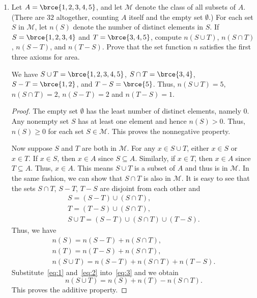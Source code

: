 \documentclass[a4paper]{article}
\begin{document}
\begin{enumerate}
\item Let \(A = \brce{1, 2, 3, 4, 5}\), and let \(\mathcal{M}\) denote the
  class of all subsets of \(A\).  (There are \(32\) altogether, counting
  \(A\) itself and the empty set \(\emptyset\).)  For each set \(S\) in
  \(\mathcal{M}\), let \(n(S)\) denote the number of distinct elements in
  \(S\).  If \(S = \brce{1, 2, 3, 4}\) and \(T = \brce{3, 4, 5}\), compute
  \(n(S \cup T)\), \(n(S \cap T)\), \(n(S - T)\), and \(n(T - S)\).  Prove
  that the set function \(n\) satisfies the first three axioms for area.

  We have \(S \cup T = \brce{1, 2, 3, 4, 5}\), \(S \cap T = \brce{3, 4}\),
  \(S - T = \brce{1, 2}\), and \(T - S = \brce{5}\).  Thus,
  \(n(S \cup T) = 5\), \(n(S \cap T) = 2\), \(n(S - T) = 2\) and
  \(n(T - S) = 1\).

  \begin{proof}
    The empty set \(\emptyset\) has the least number of distinct elements,
    namely \(0\).  Any nonempty set \(S\) has at least one element and hence
    \(n(S) > 0\).  Thus, \(n(S) \ge 0\) for each set \(S \in \mathcal{M}\).
    This proves the nonnegative property.

    Now suppose \(S\) and \(T\) are both in \(\mathcal{M}\).  For any
    \(x \in S \cup T\), either \(x \in S\) or \(x \in T\).  If \(x \in S\),
    then \(x \in A\) since \(S \subseteq A\).  Similarly, if \(x \in T\),
    then \(x \in A\) since \(T \subseteq A\).  Thus, \(x \in A\).  This
    means \(S \cup T\) is a subset of \(A\) and thus is in \(\mathcal{M}\).
    In the same fashion, we can show that \(S \cap T\) is also in
    \(\mathcal{M}\).  It is easy to see that the sets \(S \cap T\),
    \(S - T\), \(T - S\) are disjoint from each other and
    \begin{gather*}
      S = (S-T) \cup (S \cap T), \\
      T = (T-S) \cup (S \cap T), \\
      S \cup T = (S-T) \cup (S \cap T) \cup (T-S).
    \end{gather*}
    Thus, we have
    \begin{gather}
      \label{eq:1}
      n(S) = n(S-T) + n(S \cap T), \\
      \label{eq:2}
      n(T) = n(T-S) + n(S \cap T), \\
      \label{eq:3}
      n(S \cup T) = n(S - T) + n(S \cap T) + n(T - S).
    \end{gather}
    Substitute~\eqref{eq:1} and~\eqref{eq:2} into~\eqref{eq:3} and we obtain
    \[
      n(S \cup T) = n(S) + n(T) - n(S \cap T).
    \]
    This proves the additive property.


\end{proof}
\end{enumerate}
\end{document}
